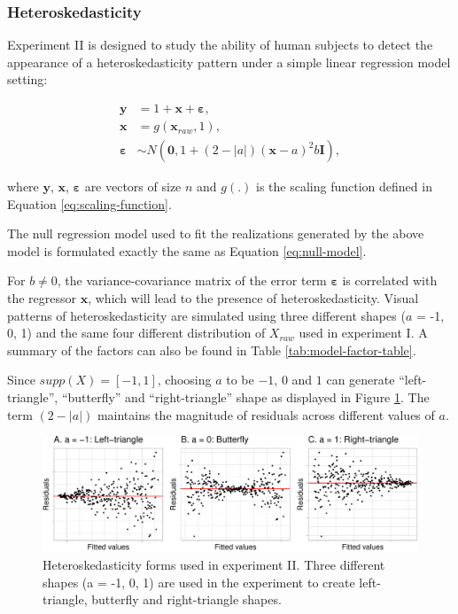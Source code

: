 \documentclass[]{interact}
\theoremstyle{plain}%
\theoremstyle{definition}
\theoremstyle{remark}
\begin{document}
\hypertarget{heteroskedasticity}{%
\subsubsection{Heteroskedasticity}\label{heteroskedasticity}}

Experiment II is designed to study the ability of human subjects to
detect the appearance of a heteroskedasticity pattern under a simple
linear regression model setting:

\begin{align} \label{eq:heter-model}
\boldsymbol{y} &= 1 + \boldsymbol{x} + \boldsymbol{\varepsilon},\\
\boldsymbol{x} &= g(\boldsymbol{x}_{raw}, 1),\\
\boldsymbol{\varepsilon} &\sim N(\boldsymbol{0}, 1 + (2 - |a|)(\boldsymbol{x} - a)^2b \boldsymbol{I}), 
\end{align}

\noindent where \(\boldsymbol{y}\), \(\boldsymbol{x}\),
\(\boldsymbol{\varepsilon}\) are vectors of size \(n\) and \(g(.)\) is
the scaling function defined in Equation \ref{eq:scaling-function}.

The null regression model used to fit the realizations generated by the
above model is formulated exactly the same as Equation
\ref{eq:null-model}.

For \(b \neq 0\), the variance-covariance matrix of the error term
\(\boldsymbol{\varepsilon}\) is correlated with the regressor
\(\boldsymbol{x}\), which will lead to the presence of
heteroskedasticity. Visual patterns of heteroskedasticity are simulated
using three different shapes (\(a\) = -1, 0, 1) and the same four
different distribution of \(X_{raw}\) used in experiment I. A summary of
the factors can also be found in Table \ref{tab:model-factor-table}.

Since \(supp(X) = [-1, 1]\), choosing \(a\) to be \(-1\), \(0\) and
\(1\) can generate ``left-triangle'', ``butterfly'' and
``right-triangle'' shape as displayed in Figure
\ref{fig:different-shape-of-heter}. The term \((2 - |a|)\) maintains the
magnitude of residuals across different values of \(a\).

\begin{figure}

{\centering \includegraphics[width=1\linewidth]{paper_comparison_files/figure-latex/different-shape-of-heter-1} 

}

\caption{Heteroskedasticity forms used in experiment II. Three different shapes (a = -1, 0, 1) are used in the experiment to create left-triangle, butterfly and right-triangle shapes.}\label{fig:different-shape-of-heter}
\end{figure}
\end{document}
